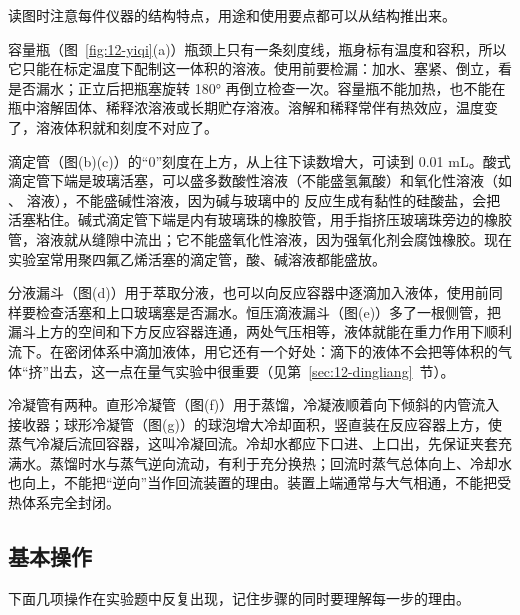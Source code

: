 \documentclass[UTF8,a4paper,zihao=5,oneside,openany,fontset=none]{ctexbook}
\begin{document}
读图时注意每件仪器的结构特点，用途和使用要点都可以从结构推出来。

容量瓶（图~\ref{fig:12-yiqi}(a)）瓶颈上只有一条刻度线，瓶身标有温度和容积，所以它只能在标定温度下配制这一体积的溶液。使用前要检漏：加水、塞紧、倒立，看是否漏水；正立后把瓶塞旋转 180° 再倒立检查一次。容量瓶不能加热，也不能在瓶中溶解固体、稀释浓溶液或长期贮存溶液。溶解和稀释常伴有热效应，温度变了，溶液体积就和刻度不对应了。

滴定管（图(b)(c)）的“0”刻度在上方，从上往下读数增大，可读到 0.01 mL。酸式滴定管下端是玻璃活塞，可以盛多数酸性溶液（不能盛氢氟酸）和氧化性溶液（如 、 溶液），不能盛碱性溶液，因为碱与玻璃中的  反应生成有黏性的硅酸盐，会把活塞粘住。碱式滴定管下端是内有玻璃珠的橡胶管，用手指挤压玻璃珠旁边的橡胶管，溶液就从缝隙中流出；它不能盛氧化性溶液，因为强氧化剂会腐蚀橡胶。现在实验室常用聚四氟乙烯活塞的滴定管，酸、碱溶液都能盛放。

分液漏斗（图(d)）用于萃取分液，也可以向反应容器中逐滴加入液体，使用前同样要检查活塞和上口玻璃塞是否漏水。恒压滴液漏斗（图(e)）多了一根侧管，把漏斗上方的空间和下方反应容器连通，两处气压相等，液体就能在重力作用下顺利流下。在密闭体系中滴加液体，用它还有一个好处：滴下的液体不会把等体积的气体“挤”出去，这一点在量气实验中很重要（见第~\ref{sec:12-dingliang}~节）。

冷凝管有两种。直形冷凝管（图(f)）用于蒸馏，冷凝液顺着向下倾斜的内管流入接收器；球形冷凝管（图(g)）的球泡增大冷却面积，竖直装在反应容器上方，使蒸气冷凝后流回容器，这叫冷凝回流。冷却水都应下口进、上口出，先保证夹套充满水。蒸馏时水与蒸气逆向流动，有利于充分换热；回流时蒸气总体向上、冷却水也向上，不能把“逆向”当作回流装置的理由。装置上端通常与大气相通，不能把受热体系完全封闭。

\subsection{基本操作}

下面几项操作在实验题中反复出现，记住步骤的同时要理解每一步的理由。
\end{document}
